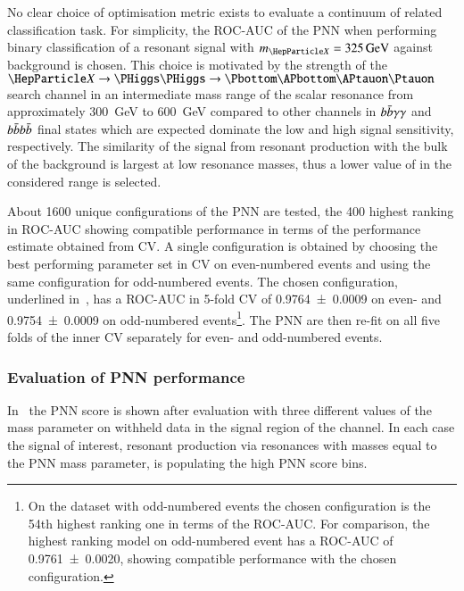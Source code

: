 No clear choice of optimisation metric exists to evaluate a continuum
of related classification task. For simplicity, the ROC-AUC of the PNN
when performing binary classification of a resonant signal with
$\mX = \SI{325}{\GeV}$ against background is chosen. This choice is
motivated by the strength of the $\PX \to \HH \to \bbtautau$ search
channel in an intermediate mass range of the scalar resonance from
approximately \SI{300}{\GeV} to \SI{600}{\GeV} compared to other
channels in $b\bar{b}\gamma\gamma$ and $b\bar{b}b\bar{b}$ final states which
are expected dominate the low and high \mX signal sensitivity,
respectively. The similarity of the \HH signal from resonant
production with the bulk of the background is largest at low resonance
masses, thus a lower value of \mX in the considered range is selected.

About 1600 unique configurations of the PNN are tested, the 400
highest ranking in ROC-AUC showing compatible performance in terms of
the performance estimate obtained from CV. A single configuration is
obtained by choosing the best performing parameter set in CV on
even-numbered events and using the same configuration for odd-numbered
events. The chosen configuration, underlined
in~, has a ROC-AUC in 5-fold CV of
\num{0.9764 +- 0.0009} on even- and \num{0.9754 +- 0.0009} on
odd-numbered events\footnote{On the dataset with odd-numbered events
  the chosen configuration is the 54th highest ranking one in terms of
  the ROC-AUC. For comparison, the highest ranking model on
  odd-numbered event has a ROC-AUC of \num{0.9761 +- 0.0020}, showing
  compatible performance with the chosen configuration.}. The PNN are
then re-fit on all five folds of the inner CV separately for even- and
odd-numbered events.

\subsubsection{Evaluation of PNN performance}

In~ the PNN score is shown after evaluation
with three different values of the mass parameter on withheld data in
the signal region of the \hadhad channel. In each case the signal of
interest, resonant production via resonances with masses equal to the
PNN mass parameter, is populating the high PNN score bins.

